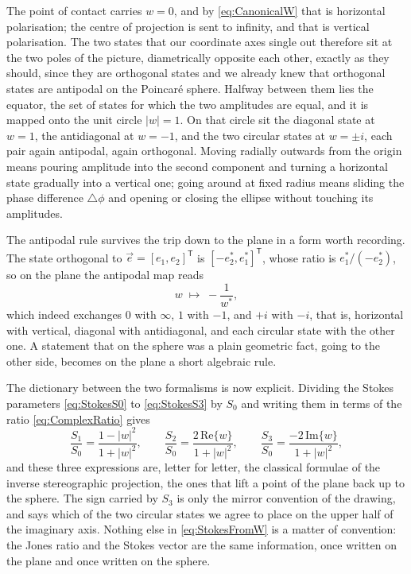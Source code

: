             The point of contact carries $w=0$, and by \ref{eq:CanonicalW} that is horizontal polarisation; the centre of projection is sent to infinity, and that is vertical polarisation. The two states that our coordinate axes single out therefore sit at the two poles of the picture, diametrically opposite each other, exactly as they should, since they are orthogonal states and we already knew that orthogonal states are antipodal on the Poincaré sphere. Halfway between them lies the equator, the set of states for which the two amplitudes are equal, and it is mapped onto the unit circle $|w|=1$. On that circle sit the diagonal state at $w=1$, the antidiagonal at $w=-1$, and the two circular states at $w=\pm i$, each pair again antipodal, again orthogonal. Moving radially outwards from the origin means pouring amplitude into the second component and turning a horizontal state gradually into a vertical one; going around at fixed radius means sliding the phase difference $\triangle\phi$ and opening or closing the ellipse without touching its amplitudes.

            The antipodal rule survives the trip down to the plane in a form worth recording. The state orthogonal to $\vec{e}=[e_1,e_2]^{\mathsf{T}}$ is $[-e_2^*,e_1^*]^{\mathsf{T}}$, whose ratio is $e_1^*/(-e_2^*)$, so on the plane the antipodal map reads
            \begin{equation}\label{eq:AntipodalW}
                w \;\longmapsto\; -\frac{1}{w^*},
            \end{equation}
            which indeed exchanges $0$ with $\infty$, $1$ with $-1$, and $+i$ with $-i$, that is, horizontal with vertical, diagonal with antidiagonal, and each circular state with the other one. A statement that on the sphere was a plain geometric fact, going to the other side, becomes on the plane a short algebraic rule.

            The dictionary between the two formalisms is now explicit. Dividing the Stokes parameters \ref{eq:StokesS0} to \ref{eq:StokesS3} by $S_0$ and writing them in terms of the ratio \ref{eq:ComplexRatio} gives
            \begin{equation}\label{eq:StokesFromW}
                \frac{S_1}{S_0} = \frac{1-|w|^2}{1+|w|^2}, \qquad \frac{S_2}{S_0} = \frac{2\,\text{Re}\{w\}}{1+|w|^2}, \qquad \frac{S_3}{S_0} = \frac{-2\,\text{Im}\{w\}}{1+|w|^2},
            \end{equation}
            and these three expressions are, letter for letter, the classical formulae of the inverse stereographic projection, the ones that lift a point of the plane back up to the sphere. The sign carried by $S_3$ is only the mirror convention of the drawing, and says which of the two circular states we agree to place on the upper half of the imaginary axis. Nothing else in \ref{eq:StokesFromW} is a matter of convention: the Jones ratio and the Stokes vector are the same information, once written on the plane and once written on the sphere.

